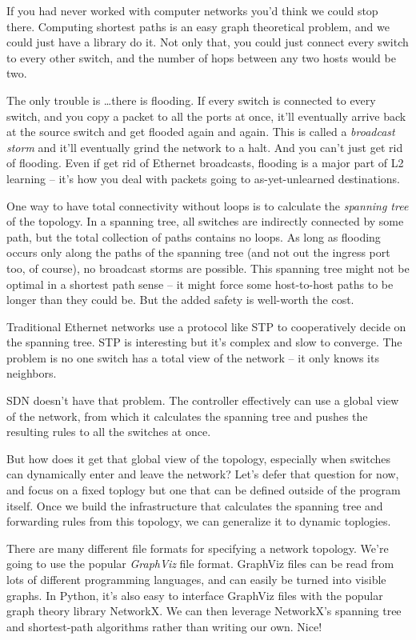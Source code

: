 If you had never worked with computer networks you'd think we could stop there.  Computing shortest paths
is an easy graph theoretical problem, and we could just have a library do it.  Not only that, you could
just connect every switch to every other switch, and the number of hops between any two hosts would be 
two.  

The only trouble is \ldots there is flooding.  If every switch is connected to every switch, and you copy
a packet to all the ports at once, it'll eventually arrive back at the source switch and get flooded again
and again.  This is called a \emph{broadcast storm} and it'll eventually grind the network to a halt.  
And you can't just get rid of flooding.  Even if get rid of Ethernet broadcasts, flooding is a major part
of L2 learning -- it's how you deal with packets going to as-yet-unlearned destinations.

One way to have total connectivity without loops is to calculate the \emph{spanning tree} of the topology.
In a spanning tree, all switches are indirectly connected by some path, but the total collection of
paths contains no loops.  As long as flooding occurs only along the paths of the spanning tree (and
not out the ingress port too, of course), no broadcast storms are possible.   This spanning tree
might not be optimal in a shortest path sense -- it might force some host-to-host paths to be longer than 
they could be.  But the added safety is well-worth the cost.  

Traditional Ethernet networks use a protocol like STP to cooperatively decide on the spanning tree.  STP is 
interesting but it's complex and slow to converge.  The problem is no one switch has a total view of the 
network -- it only knows its neighbors.  

SDN doesn't have that problem.  The controller effectively can use a
global view of the network, from which it calculates the spanning tree and pushes the resulting rules to all
the switches at once.  

But how does it get that global view of the topology, especially when switches can dynamically enter and leave the
network?  Let's defer that question for now, and focus on a fixed toplogy but one that can be
defined outside of the program itself.  Once we build the infrastructure that calculates the spanning tree
and forwarding rules from this topology, we can generalize it to dynamic toplogies.  

There are many different file formats for specifying a network topology.  We're going to use the popular
\emph{GraphViz} file format.  GraphViz files can be read from lots of different programming languages, and can easily
be turned into visible graphs.  In Python, it's also easy to interface GraphViz files with the popular 
graph theory library NetworkX.  We can then leverage NetworkX's spanning tree and shortest-path 
algorithms rather than writing our own.  Nice!

